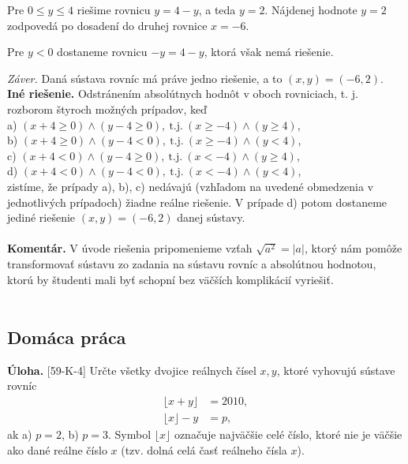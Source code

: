\documentclass[11pt,a4paper,oneside,final]{book}
\newcommand{\kom}{\textbf{Komentár.} }
\newcommand{\ul}{\textbf{Úloha.} }
\begin{document}
Pre $0 \leq y \leq 4$ riešime rovnicu $y = 4 - y$, a teda $y = 2$. Nájdenej hodnote $y = 2$ zodpovedá po dosadení do druhej rovnice $x = -6$.

Pre $y < 0$ dostaneme rovnicu $-y = 4 - y$, ktorá však nemá riešenie.

\textit{Záver.} Daná sústava rovníc má práve jedno riešenie, a to $(x, y) = (-6, 2)$.\\

\textbf{Iné riešenie.} Odstránením absolútnych hodnôt v oboch rovniciach, t. j. rozborom štyroch možných prípadov, keď\\
a) $(x + 4 \geq 0) \wedge (y - 4 \geq 0), \ \mathrm{t. j.} \ (x \geq -4) \wedge (y \geq 4)$,\\
b) $(x + 4 \geq 0) \wedge (y - 4 < 0), \ \mathrm{t. j.} \ (x \geq -4) \wedge  (y < 4)$,\\
c) $(x + 4 < 0) \wedge (y - 4 \geq 0), \ \mathrm{t. j.} \ (x < -4) \wedge  (y \geq 4)$,\\
d) $(x + 4 < 0) \wedge (y - 4 < 0), \ \mathrm{t. j.} \ (x < -4) \wedge  (y < 4)$,\\
zistíme, že prípady a), b), c) nedávajú (vzhľadom na uvedené obmedzenia v jednotlivých prípadoch) žiadne reálne riešenie. V prípade d) potom dostaneme jediné riešenie $(x, y) = (-6, 2)$ danej sústavy.\\
\\
\kom V úvode riešenia pripomenieme vzťah $\sqrt{a^2}=|a|$, ktorý nám pomôže transformovať sústavu zo zadania na sústavu rovníc a absolútnou hodnotou, ktorú by študenti mali byť schopní bez väčších komplikácií vyriešiť. \\
\\
\subsection*{Domáca práca}
\begin{tcolorbox}[breakable,notitle,boxrule=0pt,colback=light-gray,colframe=light-gray]\ul [59-K-4] Určte všetky dvojice reálnych čísel $x, y$, ktoré vyhovujú sústave rovníc
\begin{align*}
\lfloor x + y\rfloor &= 2 010,\\
\lfloor x\rfloor - y &= p,
\end{align*}
ak a) $p = 2$, b) $p = 3$.
Symbol $\lfloor x \rfloor$ označuje najväčšie celé číslo, ktoré nie je väčšie ako dané reálne číslo $x$ (tzv. dolná celá časť reálneho čísla $x$).

\end{tcolorbox}
\end{document}
